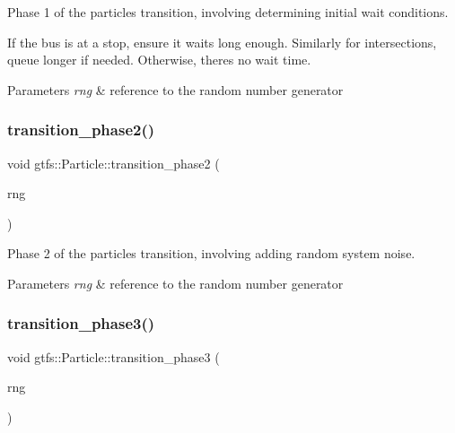 Phase 1 of the particle\textquotesingle{}s transition, involving determining initial wait conditions.

If the bus is at a stop, ensure it waits long enough. Similarly for intersections, queue longer if needed. Otherwise, there\textquotesingle{}s no wait time.


\begin{DoxyParams}{Parameters}
{\em rng} & reference to the random number generator \\
\hline
\end{DoxyParams}
\mbox{\label{classgtfs_1_1Particle_ad9374830814c89b2d5c0af705bda8849}} 
\subsubsection{\texorpdfstring{transition\+\_\+phase2()}{transition\_phase2()}}
{\footnotesize\ttfamily void gtfs\+::\+Particle\+::transition\+\_\+phase2 (\begin{DoxyParamCaption}\item[{\hyperlink{classsampling_1_1RNG}{sampling\+::\+R\+NG} \&}]{rng }\end{DoxyParamCaption})}

Phase 2 of the particle\textquotesingle{}s transition, involving adding random system noise.


\begin{DoxyParams}{Parameters}
{\em rng} & reference to the random number generator \\
\hline
\end{DoxyParams}
\mbox{\label{classgtfs_1_1Particle_a68043b2380d8f530d648dd99e5a85101}} 
\subsubsection{\texorpdfstring{transition\+\_\+phase3()}{transition\_phase3()}}
{\footnotesize\ttfamily void gtfs\+::\+Particle\+::transition\+\_\+phase3 (\begin{DoxyParamCaption}\item[{\hyperlink{classsampling_1_1RNG}{sampling\+::\+R\+NG} \&}]{rng }\end{DoxyParamCaption})}

